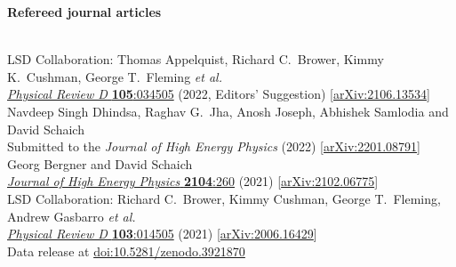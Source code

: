 \begin{spacelist}
  \item {\large \bfseries Refereed journal articles}
  \begin{revnumerate}
    \setlength{\topsep}{-8 pt}
    \setlength{\itemsep}{10 pt}
    \setlength{\leftmargin}{0 mm}
    \pagebreakitem
       \\
      LSD Collaboration: Thomas Appelquist, Richard C.~Brower, Kimmy K.~Cushman, George T.~Fleming \textit{et al.} \\ %
      \href{https://doi.org/10.1103/PhysRevD.105.034505}{\textit{Physical Review D} \textbf{105}:034505} (2022, Editors' Suggestion) [\href{http://arxiv.org/abs/2106.13534}{arXiv:2106.13534}]
    \pagebreakitem
       \\
      Navdeep Singh Dhindsa, Raghav G.~Jha, Anosh Joseph, Abhishek Samlodia and David Schaich \\
      Submitted to the \textit{Journal of High Energy Physics} (2022) [\href{http://arxiv.org/abs/2201.08791}{arXiv:2201.08791}]
    \pagebreakitem
       \\
      Georg Bergner and David Schaich \\
      \href{https://doi.org/10.1007/JHEP04(2021)260}{\textit{Journal of High Energy Physics} \textbf{2104}:260} (2021) [\href{http://arxiv.org/abs/2102.06775}{arXiv:2102.06775}]
    \pagebreakitem
       \\
      LSD Collaboration: Richard C.~Brower, Kimmy Cushman, George T.~Fleming, Andrew Gasbarro \textit{et al.} \\ %
      \href{https://doi.org/10.1103/PhysRevD.103.014505}{\textit{Physical Review D} \textbf{103}:014505} (2021) [\href{http://arxiv.org/abs/2006.16429}{arXiv:2006.16429}] \\
      Data release at \href{https://doi.org/10.5281/zenodo.3921870}{doi:10.5281/zenodo.3921870}
    \pagebreakitem
       \\

\end{revnumerate}
\end{spacelist}
